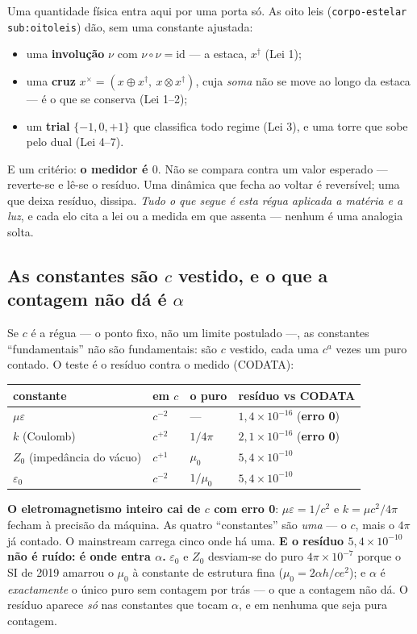 \documentclass[11pt,a4paper]{article}
\newcommand{\code}[1]{\texttt{\small #1}}
\newcommand{\dg}{^{\dagger}}
\begin{document}
Uma quantidade física entra aqui por uma porta só. As oito leis (\code{corpo-estelar sub:oitoleis}) dão,
sem uma constante ajustada:
\begin{itemize}\itemsep2pt
\item uma \textbf{involução} $\nu$ com $\nu\circ\nu=\mathrm{id}$ --- a estaca, $x\dg$ (Lei 1);
\item uma \textbf{cruz} $x^{\times}=(x\oplus x\dg,\ x\otimes x\dg)$, cuja \emph{soma} não se move ao longo
  da estaca --- é o que se conserva (Lei 1--2);
\item um \textbf{trial} $\{-1,0,+1\}$ que classifica todo regime (Lei 3), e uma torre que sobe pelo dual
  (Lei 4--7).
\end{itemize}
E um critério: \textbf{o medidor é $0$}. Não se compara contra um valor esperado --- reverte-se e lê-se o
resíduo. Uma dinâmica que fecha ao voltar é reversível; uma que deixa resíduo, dissipa. \emph{Tudo o que
segue é esta régua aplicada a matéria e a luz}, e cada elo cita a lei ou a medida em que assenta ---
nenhum é uma analogia solta.

\subsection*{As constantes são $c$ vestido, e o que a contagem não dá é $\alpha$}

Se $c$ é a régua --- o ponto fixo, não um limite postulado ---, as constantes ``fundamentais'' não são
fundamentais: são $c$ vestido, cada uma $c^{a}$ vezes um puro contado. O teste é o resíduo contra o medido
(CODATA):

\begin{center}\small
\begin{tabular}{@{}llll@{}}
\toprule
constante & em $c$ & o puro & resíduo vs CODATA \\
\midrule
$\mu\varepsilon$ & $c^{-2}$ & --- & $1{,}4\times10^{-16}$ (\textbf{erro 0}) \\
$k$ (Coulomb) & $c^{+2}$ & $1/4\pi$ & $2{,}1\times10^{-16}$ (\textbf{erro 0}) \\
$Z_0$ (impedância do vácuo) & $c^{+1}$ & $\mu_0$ & $5{,}4\times10^{-10}$ \\
$\varepsilon_0$ & $c^{-2}$ & $1/\mu_0$ & $5{,}4\times10^{-10}$ \\
\bottomrule
\end{tabular}
\end{center}

\noindent \textbf{O eletromagnetismo inteiro cai de $c$ com erro 0}: $\mu\varepsilon=1/c^2$ e
$k=\mu c^2/4\pi$ fecham à precisão da máquina. As quatro ``constantes'' são \emph{uma} --- o $c$, mais o
$4\pi$ já contado. O mainstream carrega cinco onde há uma. \textbf{E o resíduo $5{,}4\times10^{-10}$ não é
ruído: é onde entra $\alpha$.} $\varepsilon_0$ e $Z_0$ desviam-se do puro $4\pi\times10^{-7}$ porque o SI de
2019 amarrou o $\mu_0$ à constante de estrutura fina ($\mu_0=2\alpha h/ce^2$); e $\alpha$ é \emph{exactamente}
o único puro sem contagem por trás --- o que a contagem não dá. O resíduo aparece \emph{só} nas constantes que
tocam $\alpha$, e em nenhuma que seja pura contagem.
\end{document}
